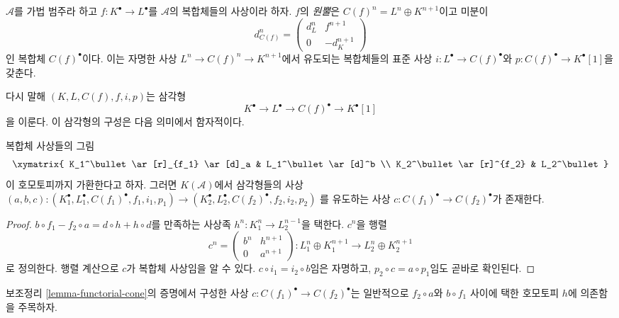 \begin{definition}
\label{definition-cone}
$\mathcal{A}$를 가법 범주라 하고
$f : K^\bullet \to L^\bullet$를 $\mathcal{A}$의 복합체들의 사상이라
하자. $f$의 {\it 원뿔}은 $C(f)^n = L^n \oplus K^{n + 1}$이고
미분이
$$
d_{C(f)}^n =
\left(
\begin{matrix}
d^n_L & f^{n + 1} \\
0 & -d_K^{n + 1}
\end{matrix}
\right)
$$
인 복합체 $C(f)^\bullet$이다. 이는 자명한 사상
$L^n \to C(f)^n \to K^{n + 1}$에서 유도되는 복합체들의 표준 사상
$i : L^\bullet \to C(f)^\bullet$와
$p : C(f)^\bullet \to K^\bullet[1]$을 갖춘다.
\end{definition}

\noindent
다시 말해 $(K, L, C(f), f, i, p)$는 삼각형
$$
K^\bullet \to L^\bullet \to C(f)^\bullet \to K^\bullet[1]
$$
을 이룬다. 이 삼각형의 구성은 다음 의미에서 함자적이다.

\begin{lemma}
\label{lemma-functorial-cone}
복합체 사상들의 그림
$$
\xymatrix{
K_1^\bullet \ar[r]_{f_1} \ar[d]_a & L_1^\bullet \ar[d]^b \\
K_2^\bullet \ar[r]^{f_2} & L_2^\bullet
}
$$
이 호모토피까지 가환한다고 하자. 그러면
$K(\mathcal{A})$에서 삼각형들의 사상
$(a, b, c) : (K_1^\bullet, L_1^\bullet, C(f_1)^\bullet, f_1, i_1, p_1)
\to
(K_2^\bullet, L_2^\bullet, C(f_2)^\bullet, f_2, i_2, p_2)$
를 유도하는 사상
$c : C(f_1)^\bullet \to C(f_2)^\bullet$가 존재한다.
\end{lemma}

\begin{proof}
$b \circ f_1 - f_2 \circ a= d \circ h + h \circ d$를 만족하는
사상족 $h^n : K_1^n \to L_2^{n - 1}$을 택한다.
$c^n$을 행렬
$$
c^n =
\left(
\begin{matrix}
b^n & h^{n + 1} \\
0 & a^{n + 1}
\end{matrix}
\right) :
L_1^n \oplus K_1^{n + 1} \to L_2^n \oplus K_2^{n + 1}
$$
로 정의한다.
행렬 계산으로 $c$가 복합체 사상임을 알 수 있다.
$c \circ i_1 = i_2 \circ b$임은 자명하고,
$p_2 \circ c = a \circ p_1$임도 곧바로 확인된다.
\end{proof}

\noindent
보조정리 \ref{lemma-functorial-cone}의 증명에서 구성한 사상
$c : C(f_1)^\bullet \to C(f_2)^\bullet$는 일반적으로
$f_2 \circ a$와 $b \circ f_1$ 사이에 택한 호모토피 $h$에
의존함을 주목하자.

